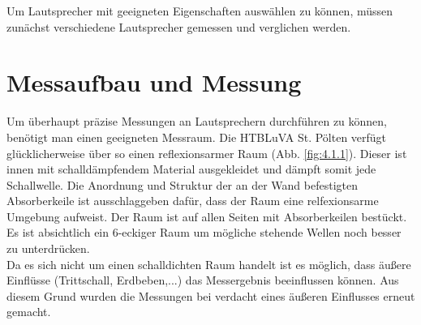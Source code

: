 
Um Lautsprecher mit geeigneten Eigenschaften auswählen zu können, müssen zunächst verschiedene Lautsprecher gemessen und verglichen werden.

\section{Messaufbau und Messung}\label{sec:4.1}
Um überhaupt präzise Messungen an Lautsprechern durchführen zu können, benötigt man einen geeigneten Messraum.
Die HTBLuVA St. Pölten verfügt glücklicherweise über so einen reflexionsarmer Raum (Abb. \ref{fig:4.1.1}).
Dieser ist innen mit schalldämpfendem Material ausgekleidet und dämpft somit jede Schallwelle.
Die Anordnung und Struktur der an der Wand befestigten Absorberkeile ist ausschlaggeben dafür, dass der Raum eine relfexionsarme Umgebung aufweist.
Der Raum ist auf allen Seiten mit Absorberkeilen bestückt.
Es ist absichtlich ein 6-eckiger Raum um mögliche stehende Wellen noch besser zu unterdrücken.\\
Da es sich nicht um einen schalldichten Raum handelt ist es möglich, dass äußere Einflüsse (Trittschall, Erdbeben,...) das Messergebnis beeinflussen können.
Aus diesem Grund wurden die Messungen bei verdacht eines äußeren Einflusses erneut gemacht.


